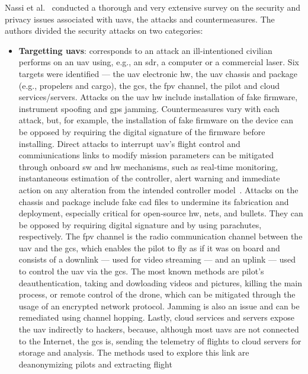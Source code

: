 Nassi et al.~\cite{nassi2021sok} conducted a thorough and very extensive survey
on the security and privacy issues associated with \glspl{uav}, the attacks and countermeasures. The authors
divided the security attacks on two categories:
\begin{itemize}
\item \textbf{Targetting \glspl{uav}}: corresponds to an attack an
  ill-intentioned civilian performs on an \gls{uav} using, e.g., an \gls{sdr}, a
  computer or a commercial laser. Six targets were identified --- the \gls{uav}
  electronic \gls{hw}, the \gls{uav} chassis and package (e.g., propelers and
  cargo), the \gls{gcs}, the \gls{fpv} channel, the pilot and cloud
  services/servers. Attacks on the \gls{uav} \gls{hw} include installation of
  fake firmware, instrument spoofing and \gls{gps} jamming. Countermeasures vary
  with each attack, but, for example, the installation of fake firmware on the
  device can be opposed by requiring the digital signature of the firmware
  before installing. Direct attacks to interrupt \gls{uav}'s flight control and
  commiunications links to modify mission parameters can be mitigated through
  onboard \gls{sw} and \gls{hw} mechanisms, such as real-time monitoring,
  instantaneous estimation of the controller, alert warning and immediate action
  on any alteration from the intended controller model~\cite{mohsan2022towards}.
  Attacks on the chassis and package include fake \gls{cad}
  files to undermine its fabrication and deployment, especially critical for
  open-source \gls{hw}, nets, and bullets. They can be opposed by requiring
  digital signature and by using parachutes, respectively.
  The \gls{fpv} channel is the radio communication channel between the \gls{uav}
  and the \gls{gcs}, which enables the pilot to fly as if it was on board and
  consists of a downlink --- used for video streaming --- and an uplink --- used
  to control the \gls{uav} via the \gls{gcs}. The most known methods are
  pilot's deauthentication, taking and dowloading videos and pictures, killing
  the main process, or remote control of the drone, which can be mitigated
  through the usage of an encrypted network protocol. Jamming is also an issue
  and can be remediated using channel hopping. Lastly, cloud services and
  servers expose the \gls{uav} indirectly to hackers, because, although most
  \glspl{uav} are not connected to the Internet, the \gls{gcs} is, sending the
  telemetry of flights to cloud servers for storage and analysis. The methods
  used to explore this link are deanonymizing pilots and extracting flight

\end{itemize}
